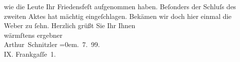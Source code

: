 \begin{ledgroupsized}[t]{13cm}
               wie die Leute Ihr Friedensfeſt aufgenommen
               haben. Beſonders der Schluſs des zweiten Aktes hat mächtig eingeſchlagen. Bekämen wir
               doch hier einmal die Weber zu ſehn.\pend
           \pstart
           Herzlich grüßt Sie Ihr Ihnen{\\[\baselineskip]}wärmſtens ergebner{\\[\baselineskip]}\spacefill\mbox{Arthur Schnitzler}\pend
           \leftskip=0em{}. 7. 99.{\\}IX. Frankgaſſe 1. \pend
           
         
         \endnumbering{}\end{ledgroupsized}  \newcommand{\dateiname}{L00943}\newcommand{\titel}{Arthur Schnitzler an Gerhart Hauptmann, 15. 7. 1899}\newcommand{\editorInnen}{ Martin Anton Müller und Gerd-Hermann Susen}
      